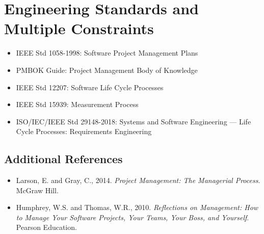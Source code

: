 \section{Engineering Standards and Multiple Constraints}

\begin{itemize}
    \item IEEE Std 1058-1998: Software Project Management Plans
    \item PMBOK\textsuperscript{\textregistered} Guide: Project Management Body of Knowledge
    \item IEEE Std 12207: Software Life Cycle Processes
    \item IEEE Std 15939: Measurement Process
    \item ISO/IEC/IEEE Std 29148-2018: Systems and Software Engineering --- Life Cycle Processes: Requirements Engineering
\end{itemize}

\subsection*{Additional References}
\begin{itemize}
    \item Larson, E. and Gray, C., 2014. \textit{Project Management: The Managerial Process}. McGraw Hill.
    \item Humphrey, W.S. and Thomas, W.R., 2010. \textit{Reflections on Management: How to Manage Your Software Projects, Your Teams, Your Boss, and Yourself}. Pearson Education.
\end{itemize}